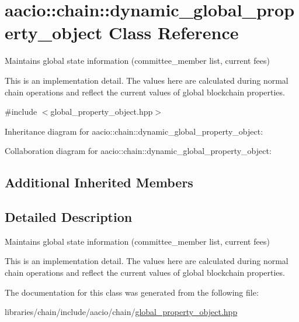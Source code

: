 \hypertarget{classaacio_1_1chain_1_1dynamic__global__property__object}{}\section{aacio\+:\+:chain\+:\+:dynamic\+\_\+global\+\_\+property\+\_\+object Class Reference}
\label{classaacio_1_1chain_1_1dynamic__global__property__object}


Maintains global state information (committee\+\_\+member list, current fees)

This is an implementation detail. The values here are calculated during normal chain operations and reflect the current values of global blockchain properties.  




{\ttfamily \#include $<$global\+\_\+property\+\_\+object.\+hpp$>$}



Inheritance diagram for aacio\+:\+:chain\+:\+:dynamic\+\_\+global\+\_\+property\+\_\+object\+:


Collaboration diagram for aacio\+:\+:chain\+:\+:dynamic\+\_\+global\+\_\+property\+\_\+object\+:
\subsection*{Additional Inherited Members}


\subsection{Detailed Description}
Maintains global state information (committee\+\_\+member list, current fees)

This is an implementation detail. The values here are calculated during normal chain operations and reflect the current values of global blockchain properties. 

The documentation for this class was generated from the following file\+:\begin{DoxyCompactItemize}
\item 
libraries/chain/include/aacio/chain/\mbox{\hyperlink{global__property__object_8hpp}{global\+\_\+property\+\_\+object.\+hpp}}\end{DoxyCompactItemize}
